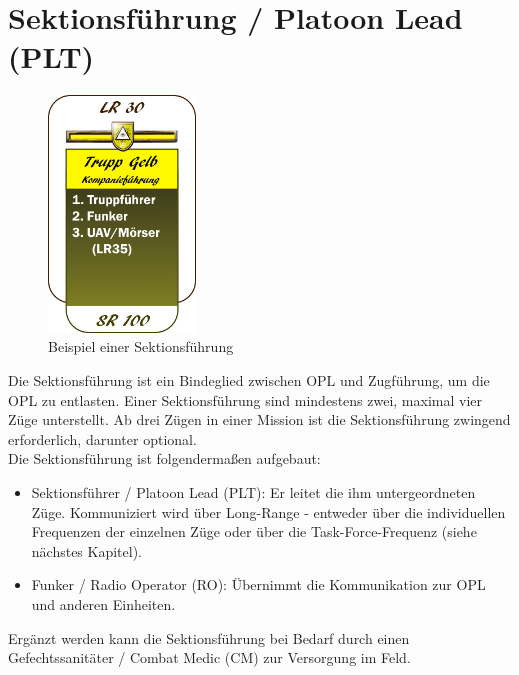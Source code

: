 \section{Sektionsführung / Platoon Lead (PLT)}
\begin{figure}
	\centering 
	\includegraphics[width=0.35\textwidth]{./img/truppenordnung/sektionsfuehrung/sektionsfuehrung.png}
	\caption{Beispiel einer Sektionsführung}
\end{figure}	

Die Sektionsführung ist ein Bindeglied zwischen OPL und Zugführung, um die OPL zu entlasten. Einer Sektionsführung sind mindestens zwei, maximal vier Züge unterstellt. Ab drei Zügen in einer Mission ist die Sektionsführung zwingend erforderlich, darunter optional.\\
Die Sektionsführung ist folgendermaßen aufgebaut:
\begin{itemize}
	\item Sektionsführer / Platoon Lead (PLT): Er leitet die ihm untergeordneten Züge. Kommuniziert wird über Long-Range - entweder über die individuellen Frequenzen der einzelnen Züge oder über die Task-Force-Frequenz (siehe nächstes Kapitel).
	\item Funker / Radio Operator (RO): Übernimmt die Kommunikation zur OPL und anderen Einheiten.
\end{itemize}
Ergänzt werden kann die Sektionsführung bei Bedarf durch einen Gefechtssanitäter / Combat Medic (CM) zur Versorgung im Feld.
